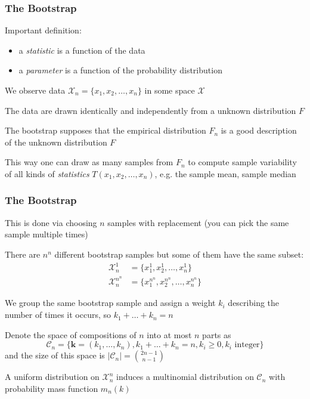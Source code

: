 \documentclass[10pt]{beamer}
\begin{document}
\begin{frame}
\frametitle{The Bootstrap}

Important definition: 
\begin{itemize}
\item a \textit{statistic} is a function of the data
\item a \textit{parameter} is a function of the probability distribution 
\end{itemize}

\vspace{0.3cm}
We observe data $\mathcal{X}_n = \{ x_1, x_2, \dots, x_n \}$ in some space $\mathcal{X}$ \newline

The data are drawn identically and independently from a unknown distribution $F$ \newline

The bootstrap supposes that the empirical distribution $F_n$ is a good description of the unknown distribution $F$ \newline

This way one can draw as many samples from $F_n$ to compute sample variability of all kinds of \textit{statistics} $T(x_1, x_2, \dots, x_n)$, e.g. the sample mean, sample median

\end{frame}

\begin{frame}
\frametitle{The Bootstrap}

This is done via choosing $n$ samples with replacement (you can pick the same sample multiple times) \newline

There are $n^n$ different bootstrap samples but some of them have the same subset: 
\begin{align}
\mathcal{X}_n^1 & = \{ x_1^1, x_2^1, \dots, x_n^1 \} \\
\mathcal{X}_n^{n^n} & = \{ x_1^{n^n}, x_2^{n^n}, \dots, x_n^{n^n} \}
\end{align}

We group the same bootstrap sample and assign a weight $k_i$ describing the number of times it occurs, so $k_1 + \dots + k_n = n$ \newline

Denote the space of compositions of $n$ into at most $n$ parts as
\[ 
\mathcal{C}_n = \{ \boldsymbol{k} = (k_1,\dots,k_n), k_1+\dots+k_n=n, k_i \ge 0, k_i \text{ integer} \}
\]
and the size of this space is $|\mathcal{C}_n| = \binom{2n-1 }{n-1}$ \newline

A uniform distribution on $\mathcal{X}_n^n$ induces a multinomial distribution on $\mathcal{C}_n$ with probability mass function $m_n(k)$
 
\end{frame}
\end{document}
